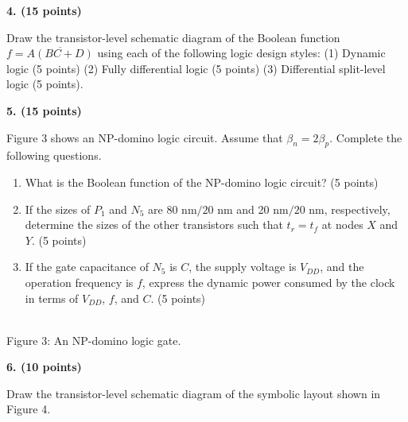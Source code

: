 \documentclass[10pt]{article}
\newcommand{\mos}[4]{\begin{scope}[shift={(#1,#2)}]
\draw (0,.24)--(0,-.24);\draw (0,.20)--(.25,.20)--(.25,.5);
\draw (0,-.20)--(.25,-.20)--(.25,-.5);\draw (-.16,.23)--(-.16,-.23);
\ifnum#4=1\draw (-.26,0) circle (.06);\draw (-.75,0)--(-.32,0);\else\draw (-.75,0)--(-.16,0);\fi
\node[anchor=east,font=\scriptsize] at (-.76,0) {$#3$};\end{scope}}
\newcommand{\ground}[2]{\draw (#1,#2)--(#1,{#2-.12});\draw ({#1-.17},{#2-.12})--({#1+.17},{#2-.12});\draw ({#1-.11},{#2-.20})--({#1+.11},{#2-.20});}
\newcommand{\rail}[3]{\draw (#1,#2)--(#1,{#2+.14});\node[above,font=\scriptsize] at (#1,{#2+.14}) {$#3$};}
\newcommand{\qheading}[1]{\par\medskip\textbf{#1}\par}
\begin{document}
\qheading{4. (15 points)} Draw the transistor-level schematic diagram of the Boolean function $f=\overline{A(BC+D)}$ using each of the following logic design styles: (1) Dynamic logic (5 points) (2) Fully differential logic (5 points) (3) Differential split-level logic (5 points).
\qheading{5. (15 points)} Figure 3 shows an NP-domino logic circuit. Assume that $\beta_n=2\beta_p$. Complete the following questions.
\begin{enumerate}[label=(\alph*),leftmargin=7mm]
\item What is the Boolean function of the NP-domino logic circuit? (5 points)
\item If the sizes of $P_1$ and $N_5$ are 80 nm$/20$ nm and 20 nm$/20$ nm, respectively, determine the sizes of the other transistors such that $t_r=t_f$ at nodes $X$ and $Y$. (5 points)
\item If the gate capacitance of $N_5$ is $C$, the supply voltage is $V_{DD}$, and the operation frequency is $f$, express the dynamic power consumed by the clock in terms of $V_{DD}$, $f$, and $C$. (5 points)
\end{enumerate}
\begin{center}\\\small Figure 3: An NP-domino logic gate.\end{center}
\newpage
\qheading{6. (10 points)} Draw the transistor-level schematic diagram of the symbolic layout shown in Figure 4.
\end{document}
